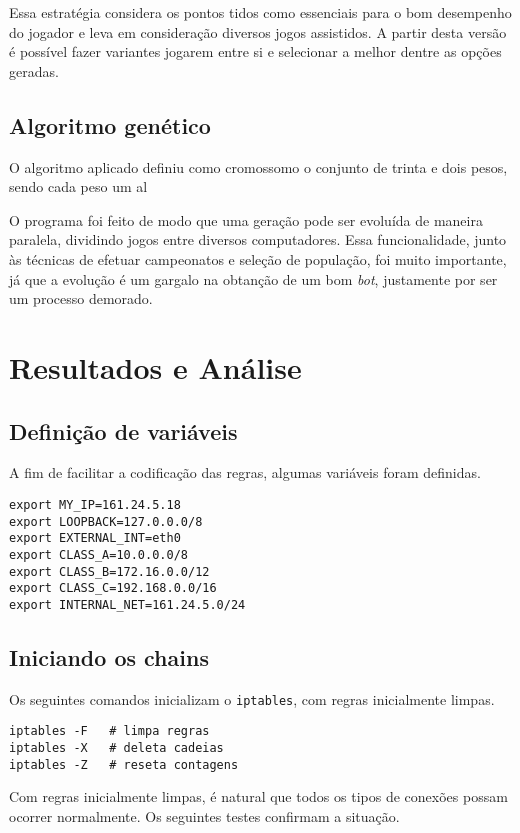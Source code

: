 \documentclass[a4paper,titlepage,11pt]{article}
\begin{document}
Essa estratégia considera os pontos tidos como essenciais para o bom desempenho do jogador e leva em consideração diversos jogos assistidos. A partir desta versão é possível fazer variantes jogarem entre si e selecionar a melhor dentre as opções geradas.


\subsection{Algoritmo genético}
O algoritmo aplicado definiu como cromossomo o conjunto de trinta e dois pesos, sendo cada peso um al

O programa foi feito de modo que uma geração pode ser evoluída de maneira paralela, dividindo jogos entre diversos computadores. Essa funcionalidade, junto às técnicas de efetuar campeonatos e seleção de população, foi muito importante, já que a evolução é um gargalo na obtanção de um bom {\em bot}, justamente por ser um processo demorado.

\section{Resultados e Análise}

\subsection{Definição de variáveis}

A fim de facilitar a codificação das regras, algumas variáveis foram definidas.
\begin{Verbatim}
export MY_IP=161.24.5.18
export LOOPBACK=127.0.0.0/8
export EXTERNAL_INT=eth0
export CLASS_A=10.0.0.0/8
export CLASS_B=172.16.0.0/12
export CLASS_C=192.168.0.0/16
export INTERNAL_NET=161.24.5.0/24
\end{Verbatim}

\subsection{Iniciando os chains}

Os seguintes comandos inicializam o \verb|iptables|, com regras inicialmente limpas.
\begin{Verbatim}
iptables -F   # limpa regras
iptables -X   # deleta cadeias
iptables -Z   # reseta contagens
\end{Verbatim}

Com regras inicialmente limpas, é natural que todos os tipos de conexões possam ocorrer normalmente. Os seguintes testes confirmam a situação.
\end{document}
